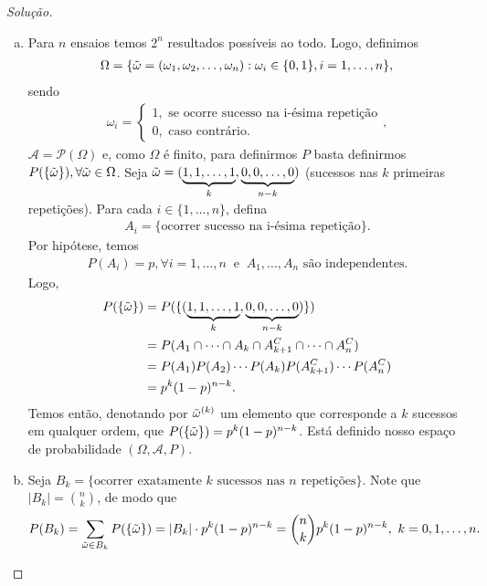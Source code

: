 \documentclass[../Notas.tex]{subfiles}
\begin{document}
\begin{proof}[Solução]
\begin{enumerate}[(a)]
    \item Para $n$ ensaios temos $2^n$ resultados possíveis ao todo. Logo, definimos
    \begin{align*}
        \Omega = \{ \Tilde{\omega} = (\omega_1, \omega_2, \dots, \omega_n) : \omega_i\in\{0,1\}, i=1, \dots, n  \},
    \end{align*}
    sendo
    \begin{align*}
        \omega_i = \begin{cases}
        1, \text{ se ocorre sucesso na i-ésima repetição} \\
        0, \text{ caso contrário}.
        \end{cases},
    \end{align*}
    $\mathcal{A} = \mathcal{P}(\Omega)$ e, como $\Omega$ é finito, para definirmos $P$ basta definirmos $P(\{ \Tilde{\omega} \}), \forall \Tilde{\omega}\in\Omega$. Seja $\Tilde{\omega} = (\underbrace{1,1,\dots,1}_{k}, \underbrace{0,0,\dots,0}_{n-k})$ (sucessos nas $k$ primeiras repetições). Para cada $i\in\{1, \dots, n\}$, defina
    \begin{align*}
        A_i = \{ \text{ocorrer sucesso na i-ésima repetição} \}.
    \end{align*}
    Por hipótese, temos
    \begin{align*}
        P(A_i) = p, \forall i=1,\dots, n \ \text{ e } \ A_1, \dots, A_n \text{ são independentes.}
    \end{align*}
    Logo, 
    \begin{align*}
        P(\{ \Tilde{\omega} \}) &= P(\{ (\underbrace{1,1,\dots,1}_{k}, \underbrace{0,0,\dots,0}_{n-k}) \}) \\
        &= P(A_1\cap\cdots\cap A_k\cap A_{k+1}^C\cap\cdots\cap A_n^C) \\
        &= P(A_1)P(A_2)\cdots P(A_k)P(A_{k+1}^C)\cdots P(A_n^C) \\
        &= p^k(1-p)^{n-k}.
    \end{align*}
    Temos então, denotando por $\Tilde{\omega}^{(k)}$ um elemento que corresponde a $k$ sucessos em qualquer ordem, que $P(\{ \Tilde{\omega} \}) = p^k(1-p)^{n-k}$. Está definido nosso espaço de probabilidade $(\Omega, \mathcal{A}, P)$.
    
    \item Seja $B_k = \{ \text{ocorrer exatamente } k \text{ sucessos nas } n \text{ repetições} \}$. Note que $\displaystyle{|B_k| = \binom{n}{k}}$, de modo que
    \begin{align*}
        P(B_k) = \sum_{\Tilde{\omega}\in B_k}P(\{ \Tilde{\omega} \}) = |B_k|\cdot p^k(1-p)^{n-k} = \binom{n}{k}p^k(1-p)^{n-k}, \ k = 0, 1, \dots, n.
    \end{align*}
    

\end{enumerate}
\end{proof}
\end{document}
